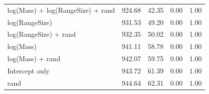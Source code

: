 \begin{landscape}
\begin{table}[ht]
\begin{tabular}{@{}lrrrr@{}}
  log(Mass) + log(RangeSize) + rand & 924.68 & 42.35 & 0.00 & 1.00 \\ 
  log(RangeSize) & 931.53 & 49.20 & 0.00 & 1.00 \\ 
  log(RangeSize) + rand & 932.35 & 50.02 & 0.00 & 1.00 \\ 
  log(Mass) & 941.11 & 58.78 & 0.00 & 1.00 \\ 
  log(Mass) + rand & 942.07 & 59.75 & 0.00 & 1.00 \\ 
  Intercept only & 943.72 & 61.39 & 0.00 & 1.00 \\ 
  rand & 944.64 & 62.31 & 0.00 & 1.00 \\ 
   \bottomrule
\end{tabular}
\endgroup
\end{table}


\end{landscape}

